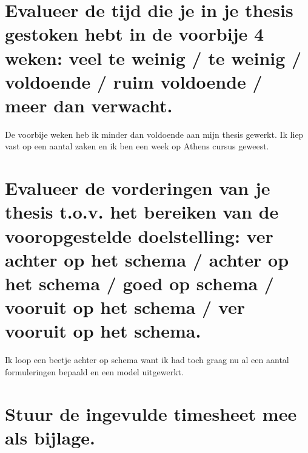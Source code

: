 \documentclass[a4paper, 11pt]{article}
\begin{document}
\section{Evalueer de tijd die je in je thesis gestoken hebt in de voorbije 4 weken: veel te weinig / te weinig / voldoende / ruim voldoende / meer dan verwacht.}
De voorbije weken heb ik minder dan voldoende aan mijn thesis gewerkt. Ik liep vast op een aantal zaken en ik ben een week op Athens cursus geweest. 
\section{Evalueer de vorderingen van je thesis t.o.v. het bereiken van de vooropgestelde doelstelling: ver achter op het schema / achter op het schema / goed op schema / vooruit op het schema / ver vooruit op het schema.}
Ik loop een beetje achter op schema want ik had toch graag nu al een aantal formuleringen bepaald en een model uitgewerkt.
\section{Stuur de ingevulde timesheet mee als bijlage.}
\end{document}
